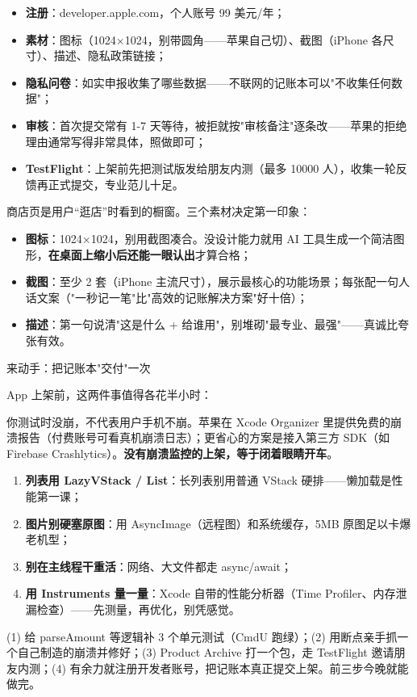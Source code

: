 \begin{itemize}
  \item \textbf{注册}：developer.apple.com，个人账号 99 美元/年；
  \item \textbf{素材}：图标（1024×1024，别带圆角——苹果自己切）、截图（iPhone 各尺寸）、描述、隐私政策链接；
  \item \textbf{隐私问卷}：如实申报收集了哪些数据——不联网的记账本可以"不收集任何数据"；
  \item \textbf{审核}：首次提交常有 1-7 天等待，被拒就按"审核备注"逐条改——苹果的拒绝理由通常写得非常具体，照做即可；
  \item \textbf{TestFlight}：上架前先把测试版发给朋友内测（最多 10000 人），收集一轮反馈再正式提交，专业范儿十足。
\end{itemize}


商店页是用户“逛店”时看到的橱窗。三个素材决定第一印象：

\begin{itemize}
  \item \textbf{图标}：1024×1024，别用截图凑合。没设计能力就用 AI 工具生成一个简洁图形，\textbf{在桌面上缩小后还能一眼认出}才算合格；
  \item \textbf{截图}：至少 2 套（iPhone 主流尺寸），展示最核心的功能场景；每张配一句人话文案（"一秒记一笔"比"高效的记账解决方案"好十倍）；
  \item \textbf{描述}：第一句说清"这是什么 + 给谁用"，别堆砌"最专业、最强"——真诚比夸张有效。
\end{itemize}

\begin{tcbpractice}{来动手：把记账本"交付"一次}

App 上架前，这两件事值得各花半小时：


你测试时没崩，不代表用户手机不崩。苹果在 Xcode Organizer 里提供免费的崩溃报告（付费账号可看真机崩溃日志）；更省心的方案是接入第三方 SDK（如 Firebase Crashlytics）。\textbf{没有崩溃监控的上架，等于闭着眼睛开车}。


\begin{enumerate}
  \item \textbf{列表用 LazyVStack / List}：长列表别用普通 VStack 硬排——懒加载是性能第一课；
  \item \textbf{图片别硬塞原图}：用 AsyncImage（远程图）和系统缓存，5MB 原图足以卡爆老机型；
  \item \textbf{别在主线程干重活}：网络、大文件都走 async/await；
  \item \textbf{用 Instruments 量一量}：Xcode 自带的性能分析器（Time Profiler、内存泄漏检查）——先测量，再优化，别凭感觉。
\end{enumerate}

(1) 给 parseAmount 等逻辑补 3 个单元测试（CmdU 跑绿）；(2) 用断点亲手抓一个自己制造的崩溃并修好；(3) Product Archive 打一个包，走 TestFlight 邀请朋友内测；(4) 有余力就注册开发者账号，把记账本真正提交上架。前三步今晚就能做完。

\end{tcbpractice}

